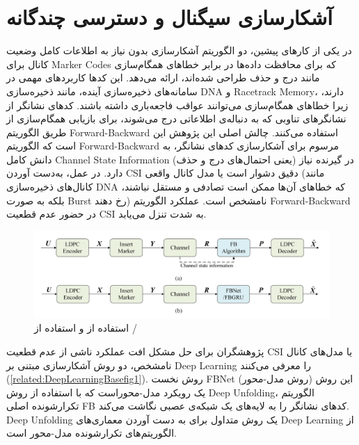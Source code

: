 \section{آشکارسازی سیگنال و دسترسی چندگانه}
در یکی از کارهای پیشین، دو الگوریتم آشکارسازی بدون نیاز به اطلاعات کامل وضعیت کانال برای
\glspl{Marker Code}
 که برای محافظت داده‌ها در برابر خطاهای همگام‌سازی مانند درج و حذف طراحی شده‌اند، ارائه می‌دهد. این کدها کاربردهای مهمی در سامانه‌های ذخیره‌سازی آینده، مانند ذخیره‌سازی DNA و 
\gls{Racetrack Memory}،
  دارند، زیرا خطاهای همگام‌سازی می‌توانند عواقب فاجعه‌باری داشته باشند. کدهای نشانگر از نشانگرهای تناوبی که به دنباله‌ی اطلاعاتی درج می‌شوند، برای بازیابی همگام‌سازی از طریق الگوریتم 
\gls{Forward-Backward}
  استفاده می‌کنند.
چالش اصلی این پژوهش این است که الگوریتم 
\gls{Forward-Backward}
 مرسوم برای آشکارسازی کدهای نشانگر، به دانش کامل 
\gls{Channel State Information}
  (یعنی احتمال‌های درج و حذف) در گیرنده نیاز دارد. در عمل، به‌دست آوردن CSI دقیق دشوار است یا مدل کانال واقعی (مانند کانال‌های ذخیره‌سازی DNA که خطاهای آن‌ها ممکن است تصادفی و مستقل نباشند، بلکه به صورت 
\gls{Burst}
   رخ دهند) نامشخص است. عملکرد الگوریتم 
\gls{Forward-Backward}
    در حضور عدم قطعیت CSI به شدت تنزل می‌یابد.
\begin{figure}
  	\centering
  	\includegraphics[width=0.9\linewidth]{./Pic/DeepLearningBased_fig1}
  	\caption[  استفاده از و  استفاده از /]{ استفاده از و  استفاده از / \cite{DeepLearningBased}}
  	\label{related:DeepLearningBasefig1}
\end{figure}
پژوهشگران برای حل مشکل افت عملکرد ناشی از عدم قطعیت CSI یا مدل‌های کانال نامشخص، دو روش آشکارسازی مبتنی بر
 \gls{Deep Learning}
  را معرفی می‌کنند 
(\autoref{related:DeepLearningBasefig1}).
روش نخست FBNet (روش مدل-محور) این روش یک رویکرد مدل-محوراست که با استفاده از روش 
\gls{Deep Unfolding}،
 الگوریتم تکرارشونده اصلی FB کدهای نشانگر را به لایه‌های یک شبکه‌ی عصبی نگاشت می‌کند.
\gls{Deep Unfolding}
 یک روش متداول برای به دست آوردن معماری‌های 
\gls{Deep Learning}
  از الگوریتم‌های تکرارشونده مدل-محور است.
  
